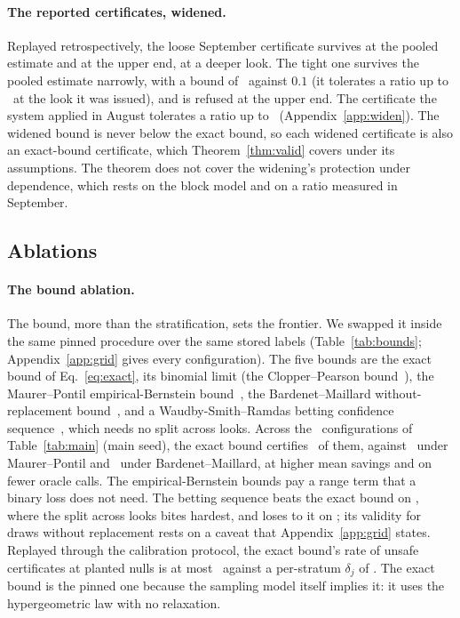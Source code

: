 \keeprunin
\paragraph{The reported certificates, widened.} Replayed
retrospectively, the loose September certificate survives at the pooled estimate and at
the upper end, at a deeper look. The tight one
survives the pooled estimate narrowly, with a bound of
\widenSepTightBoundEst\ against $0.1$ (it tolerates a ratio up to
\widenSepTightPhiIssued\ at the look it was issued), and is refused at
the upper end. The certificate the system applied in August tolerates a
ratio up to \widenAppliedPhi\ (Appendix~\ref{app:widen}). The widened
bound is never below the exact bound, so each widened certificate is
also an exact-bound certificate, which Theorem~\ref{thm:valid} covers
under its assumptions. The theorem does not cover the widening's
protection under dependence, which rests on the block model and on a
ratio measured in September.
\fi

\keepheading
\subsection{Ablations}
\label{sec:exp-ablations}

\keeprunin
\paragraph{The bound ablation.} The bound, more than the
stratification, sets the frontier. We swapped it inside the same pinned
procedure over the same stored labels (Table~\ref{tab:bounds};
Appendix~\ref{app:grid} gives every configuration). The five bounds are
the exact bound of Eq.~\eqref{eq:exact}, its binomial limit (the
Clopper--Pearson bound~\cite{clopper}), the Maurer--Pontil
empirical-Bernstein bound~\cite{maurer}, the Bardenet--Maillard
without-replacement bound~\cite{serfling,bardenet}, and a
Waudby-Smith--Ramdas betting confidence sequence~\cite{wsr}, which needs
no split across looks. Across the \boundConfigsTotal\ configurations of
Table~\ref{tab:main} (main seed), the exact bound certifies
\boundExactConfigs\ of them, against \boundEbConfigs\ under
Maurer--Pontil and \boundWorConfigs\ under Bardenet--Maillard, at higher
mean savings and on fewer oracle calls. The empirical-Bernstein bounds
pay a range term that a binary loss does not need. The betting sequence
beats the exact bound on \boundBetBetterText, where the split
across looks bites hardest, and loses to it on \boundBetWorseText; its
validity for draws without replacement rests on a caveat that
Appendix~\ref{app:grid} states. Replayed through the calibration
protocol, the exact bound's rate of unsafe certificates at planted nulls
is at most \boundExactNullUnsafe\ against a per-stratum $\delta_j$ of
\boundNullDeltaS. The exact bound is the pinned one because the
sampling model itself implies it: it uses the hypergeometric law with no
relaxation.

